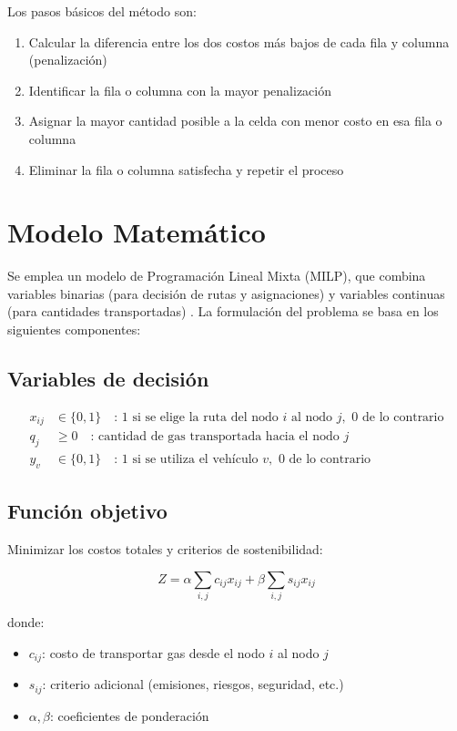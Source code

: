 \documentclass[11pt, a4paper]{article}
\begin{document}
Los pasos básicos del método son:
\begin{enumerate}[label=\roman*., leftmargin=*]
    \item Calcular la diferencia entre los dos costos más bajos de cada fila y columna (penalización)
    \item Identificar la fila o columna con la mayor penalización
    \item Asignar la mayor cantidad posible a la celda con menor costo en esa fila o columna
    \item Eliminar la fila o columna satisfecha y repetir el proceso
\end{enumerate}

\section{Modelo Matemático}
Se emplea un modelo de Programación Lineal Mixta (MILP), que combina variables binarias (para decisión de rutas y asignaciones) y variables continuas (para cantidades transportadas) \citep{Winston2004}. La formulación del problema se basa en los siguientes componentes:

\subsection{Variables de decisión}  
\begin{align}  
x_{ij} & \in \{0,1\} \quad \text{: 1 si se elige la ruta del nodo } i \text{ al nodo } j, \text{ 0 de lo contrario} \\
q_{j} & \geq 0 \quad \text{: cantidad de gas transportada hacia el nodo } j \\
y_{v} & \in \{0,1\} \quad \text{: 1 si se utiliza el vehículo } v, \text{ 0 de lo contrario}  
\end{align}  

\subsection{Función objetivo}  
Minimizar los costos totales y criterios de sostenibilidad:  

\begin{equation}
Z = \alpha \sum_{i,j} c_{ij} x_{ij} + \beta \sum_{i,j} s_{ij} x_{ij}  
\end{equation}

\noindent donde:  
\begin{itemize}[leftmargin=*]  
    \item $ c_{ij} $: costo de transportar gas desde el nodo $ i $ al nodo $ j $  
    \item $ s_{ij} $: criterio adicional (emisiones, riesgos, seguridad, etc.)  
    \item $ \alpha, \beta $: coeficientes de ponderación  
\end{itemize}  
\end{document}
